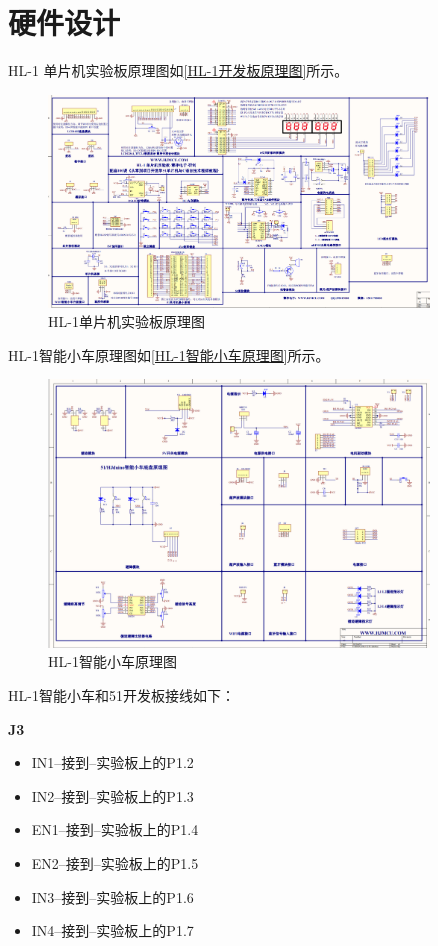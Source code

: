 \section{硬件设计}\label{硬件设计}
HL-1 单片机实验板原理图如\autoref{HL-1开发板原理图}所示。
\begin{figure}[!htbp]
    \centering
    \includegraphics[width =0.9\textwidth]{figures/开发板原理图.png}
    \caption{HL-1单片机实验板原理图}
    \label{HL-1开发板原理图}
\end{figure}
\newline

HL-1智能小车原理图如\autoref{HL-1智能小车原理图}所示。
\begin{figure}[!htbp]
    \centering
    \includegraphics[width =0.9\textwidth]{figures/智能小车原理图.png}
    \caption{HL-1智能小车原理图}
    \label{HL-1智能小车原理图}
\end{figure}
\newline

HL-1智能小车和51开发板接线如下：

\textbf{J3}
\begin{itemize}
    \item IN1--接到--实验板上的P1.2
    \item IN2--接到--实验板上的P1.3
    \item EN1--接到--实验板上的P1.4
    \item EN2--接到--实验板上的P1.5
    \item IN3--接到--实验板上的P1.6
    \item IN4--接到--实验板上的P1.7
\end{itemize}

